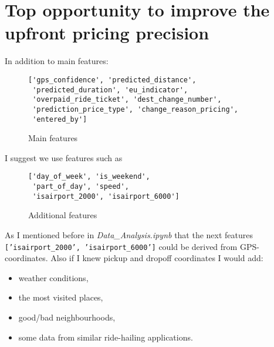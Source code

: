 \documentclass[11pt]{article}
\begin{document}
\section{Top opportunity to improve the upfront pricing precision}
In addition to main features:
\begin{figure}[H]
\centering
\begin{varwidth}{\linewidth}
\begin{verbatim}
['gps_confidence', 'predicted_distance', 
 'predicted_duration', 'eu_indicator', 
 'overpaid_ride_ticket', 'dest_change_number',
 'prediction_price_type', 'change_reason_pricing',
 'entered_by']
\end{verbatim}
\end{varwidth}
\caption{Main features}
\end{figure}
I suggest we use features such as
\begin{figure}[H]
\centering
\begin{varwidth}{\linewidth}
\begin{verbatim}
['day_of_week', 'is_weekend', 
 'part_of_day', 'speed', 
 'isairport_2000', 'isairport_6000']
\end{verbatim}
\end{varwidth}
\caption{Additional features}
\end{figure}
As I mentioned before in \textit{Data\_Analysis.ipynb} that the next features
\texttt{['isairport\_2000', 'isairport\_6000']} could be derived from GPS-coordinates. Also if I knew pickup and dropoff coordinates I would add:
\begin{itemize}
\item weather conditions,
\item the most visited places,
\item good/bad neighbourhoods,
\item some data from similar ride-hailing applications.
\end{itemize}
\end{document}
